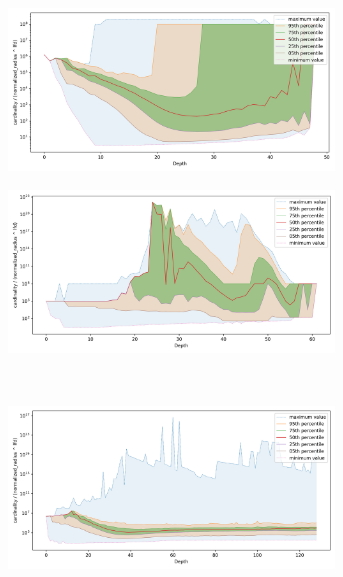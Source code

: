\documentclass[review,supplement,onefignum,onetabnum]{siamonline220329}
\begin{document}
\begin{figure}[ht!]
    \begin{subfigure}[b]{0.47\textwidth}
    \includegraphics[width=0.95\textwidth]{images/fractal_density/sift-1000000.png}\\
    \label{fig:results:sift-fractal_density}
    \end{subfigure}%
    \begin{subfigure}[b]{0.47\textwidth}
    \includegraphics[width=0.95\textwidth]{images/fractal_density/radio-ml-97920.png}\\
    \label{fig:results:radioml-fractal_density}
    \end{subfigure}%
    \\
    \begin{subfigure}[b]{0.47\textwidth}
    \includegraphics[width=0.95\textwidth]{images/fractal_density/silva-2224640.png}\\

\end{subfigure}
\end{figure}
\end{document}
